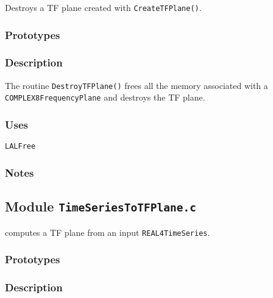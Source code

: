 Destroys a TF plane created with \texttt{CreateTFPlane()}.

\subsubsection*{Prototypes}
\vspace{0.1in}


\subsubsection*{Description}

The routine \verb+DestroyTFPlane()+ frees all the memory associated with a
\verb+COMPLEX8FrequencyPlane+ and destroys the TF plane.

\subsubsection*{Uses}
\begin{verbatim}
LALFree
\end{verbatim}

\subsubsection*{Notes}

\vfill{\footnotesize}

\newpage
\subsection{Module \texttt{TimeSeriesToTFPlane.c}}
\label{ss:TimeSeriesToTFPlane.c}

computes a TF plane from an input 
\verb+REAL4TimeSeries+.

\subsubsection*{Prototypes}
\vspace{0.1in}


\subsubsection*{Description}

